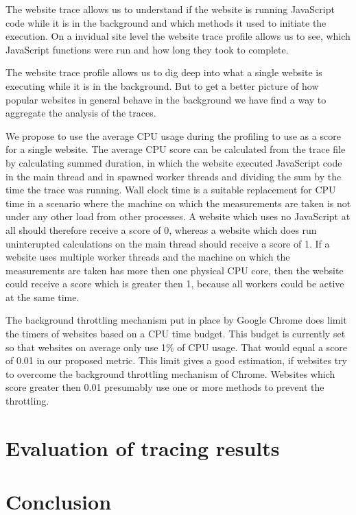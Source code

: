 \documentclass[article,type=bsc,colorback,accentcolor=tud9c]{tudthesis}
\begin{document}
  The website trace allows us to understand if the website is running JavaScript code while it is in the background and which methods it used to initiate the execution. On a invidual site level the website trace profile allows us to see, which JavaScript functions were run and how long they took to complete.

  The website trace profile allows us to dig deep into what a single website is executing while it is in the background. But to get a better picture of how popular websites in general behave in the background we have find a way to aggregate the analysis of the traces.

  We propose to use the average CPU usage during the profiling to use as a score for a single website. The average CPU score can be calculated from the trace file by calculating summed duration, in which the website executed JavaScript code in the main thread and in spawned worker threads and dividing the sum by the time the trace was running. Wall clock time is a suitable replacement for CPU time in a scenario where the machine on which the measurements are taken is not under any other load from other processes. A website which uses no JavaScript at all should therefore receive a score of 0, whereas a website which does run uninterupted calculations on the main thread should receive a score of 1. If a website uses multiple worker threads and the machine on which the measurements are taken has more then one physical CPU core, then the website could receive a score which is greater then 1, because all workers could be active at the same time.

  The background throttling mechanism put in place by Google Chrome does limit the timers of websites based on a CPU time budget. This budget is currently set so that websites on average only use 1\% of CPU usage. That would equal a score of 0.01 in our proposed metric. This limit gives a good estimation, if websites try to overcome the background throttling mechanism of Chrome. Websites which score greater then 0.01 presumably use one or more methods to prevent the throttling.

  


  
  \newpage
  \section{Evaluation of tracing results}
  
  \newpage
  \section{Conclusion}

  
  \newpage
  \printbibliography

   
\end{document}
